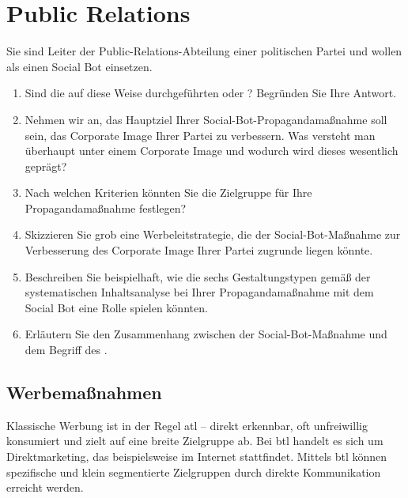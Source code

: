 \chapter{Public Relations}
\label{ch:04_public-relations}

\begin{universityTask}
    Sie sind Leiter der Public-Relations-Abteilung einer politischen Partei und wollen als  einen Social Bot einsetzen.

    \vspace{0.5cm}

    \begin{enumerate}[label=(\alph*)]
        \item Sind die auf diese Weise durchgeführten   oder ? Begründen Sie Ihre Antwort.
        \item Nehmen wir an, das Hauptziel Ihrer Social-Bot-Propagandamaßnahme soll sein, das Corporate Image Ihrer Partei zu verbessern. Was versteht man überhaupt unter einem Corporate Image und wodurch wird dieses  wesentlich geprägt?
        \item Nach welchen Kriterien könnten Sie die Zielgruppe für Ihre Propagandamaßnahme festlegen?
        \item Skizzieren Sie grob eine Werbeleitstrategie, die der Social-Bot-Maßnahme zur Verbesserung des Corporate Image Ihrer Partei zugrunde liegen könnte.
        \item Beschreiben Sie beispielhaft, wie die sechs Gestaltungstypen gemäß der systematischen Inhaltsanalyse bei Ihrer Propagandamaßnahme mit dem Social Bot eine Rolle spielen könnten.
        \item Erläutern Sie den Zusammenhang zwischen der Social-Bot-Maßnahme und dem Begriff des .
    \end{enumerate}
\end{universityTask}

\section{Werbemaßnahmen}
\label{sec:04-01_advertising-measures}

Klassische Werbung ist in der Regel \Gls{atl} -- direkt erkennbar, oft unfreiwillig konsumiert und zielt auf eine breite Zielgruppe ab. Bei \Gls{btl} handelt es sich um Direktmarketing, das beispielsweise im Internet stattfindet. Mittels \Gls{btl} können spezifische und klein segmentierte Zielgruppen durch direkte Kommunikation erreicht werden. \cite[S. 26]{002_MKO03_communication-communication-goals-and-advertising-conception}

